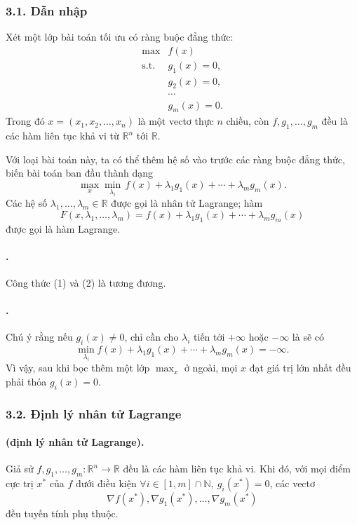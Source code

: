 \documentclass[11pt]{article}
\begin{document}
\subsubsection*{3.1. Dẫn nhập}

Xét một lớp bài toán tối ưu có ràng buộc đẳng thức:
\[
\begin{array}{ll}
  \max & f(x) \\
  \text{s.t.} & g_1(x)=0,\\
              & g_2(x)=0,\\
              & \cdots\\
              & g_m(x)=0.
\end{array}
\tag{1}
\]
Trong đó \(x=(x_1,x_2,\ldots,x_n)\) là một vectơ thực \(n\) chiều, còn
\(f,g_1,\ldots,g_m\) đều là các hàm liên tục khả vi từ \(\mathbb R^n\) tới
\(\mathbb R\).

Với loại bài toán này, ta có thể thêm hệ số vào trước các ràng buộc đẳng thức,
biến bài toán ban đầu thành dạng
\[
  \max_x\min_{\lambda_i}\,
  f(x)+\lambda_1g_1(x)+\cdots+\lambda_mg_m(x).
\tag{2}
\]
Các hệ số \(\lambda_1,\ldots,\lambda_m\in\mathbb R\) được gọi là nhân tử
Lagrange; hàm
\[
  F(x,\lambda_1,\ldots,\lambda_m)
  =f(x)+\lambda_1g_1(x)+\cdots+\lambda_mg_m(x)
\]
được gọi là hàm Lagrange.

\paragraph{.}
Công thức (1) và (2) là tương đương.

\paragraph{.}
Chú ý rằng nếu \(g_i(x)\ne 0\), chỉ cần cho \(\lambda_i\) tiến tới \(+\infty\)
hoặc \(-\infty\) là sẽ có
\[
  \min_{\lambda_i} f(x)+\lambda_1g_1(x)+\cdots+\lambda_mg_m(x)=-\infty.
\]
Vì vậy, sau khi bọc thêm một lớp \(\max_x\) ở ngoài, mọi \(x\) đạt giá trị lớn
nhất đều phải thỏa \(g_i(x)=0\).

\subsubsection*{3.2. Định lý nhân tử Lagrange}

\paragraph{ (định lý nhân tử Lagrange).}
Giả sử \(f,g_1,\ldots,g_m:\mathbb R^n\to\mathbb R\) đều là các hàm liên tục
khả vi. Khi đó, với mọi điểm cực trị \(x^\ast\) của \(f\) dưới điều kiện
\(\forall i\in[1,m]\cap\mathbb N,\ g_i(x^\ast)=0\), các vectơ
\[
  \nabla f(x^\ast),\nabla g_1(x^\ast),\ldots,\nabla g_m(x^\ast)
\]
đều tuyến tính phụ thuộc.
\end{document}

